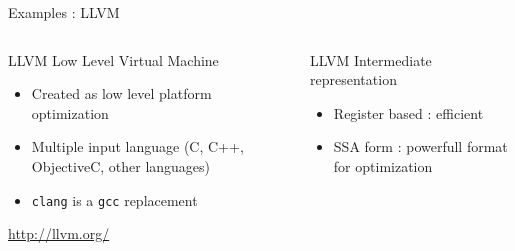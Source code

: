 %
\begin{Frame}{Examples : LLVM}
  \begin{columns}[t]
    \begin{column}{\BW} %
      \begin{block}{LLVM Low Level Virtual Machine}
        \begin{itemize}
        \item Created as low level platform optimization
        \item Multiple input language (C, C++, ObjectiveC, other languages)
        \item \texttt{clang} is a \texttt{gcc} replacement
        \end{itemize}
      \end{block} 
      \href{http://llvm.org/}{http://llvm.org/}
    \end{column}
    
    \begin{column}{\BW} %
      \begin{block}{LLVM Intermediate representation}
        \begin{itemize}
        \item Register based : efficient
        \item SSA form : powerfull format for optimization
        \end{itemize}
      \end{block}   
    \end{column}
  \end{columns}  
\end{Frame}


